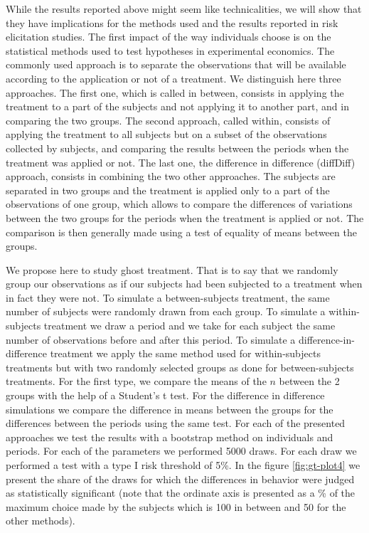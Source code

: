 \documentclass[
]{book}
\begin{document}
While the results reported above might seem like technicalities, we will show
that they have implications for the methods used and the results reported in
risk elicitation studies.
The first impact of the way individuals choose is on the statistical methods
used to test hypotheses in experimental economics.
The commonly used approach is to
separate the observations that will be available according to the
application or not of a treatment. We distinguish here three approaches.
The first one, which is called in between, consists in applying the
treatment to a part of the subjects and not applying it to another part,
and in comparing the two groups. The second approach, called within,
consists of applying the treatment to all subjects but on a subset of
the observations collected by subjects, and comparing the results
between the periods when the treatment was applied or not. The last one,
the difference in difference (diffDiff) approach, consists in combining
the two other approaches. The subjects are separated in two groups and
the treatment is applied only to a part of the observations of one
group, which allows to compare the differences of variations between the
two groups for the periods when the treatment is applied or not. The
comparison is then generally made using a test of equality of means
between the groups.

We propose here to study ghost treatment. That is to say that we randomly group
our observations as if our subjects had been subjected
to a treatment when in fact they were not.
To simulate a between-subjects treatment, the same number of subjects
were randomly drawn from each group.
To simulate a within-subjects treatment we draw a
period and we take for each subject the same number of observations
before and after this period.
To simulate a difference-in-difference
treatment we apply the same method used for within-subjects treatments but with
two randomly selected groups as done for between-subjects treatments.
For the first type, we
compare the means of the \(n\) between the 2 groups with the help of a
Student's t test. For the difference in difference simulations we
compare the difference in means between the groups for the differences
between the periods using the same test. For each of the presented
approaches we test the results with a bootstrap method on individuals
and periods.
For each of the parameters we performed 5000 draws.
For each draw we performed a test with a type I risk threshold of 5\%.
In the figure \ref{fig:gt-plot4} we present the share of the draws for which the
differences in behavior were judged as statistically significant (note
that the ordinate axis is presented as a \% of the maximum choice made by
the subjects which is 100 in between and 50 for the other methods).
\end{document}
